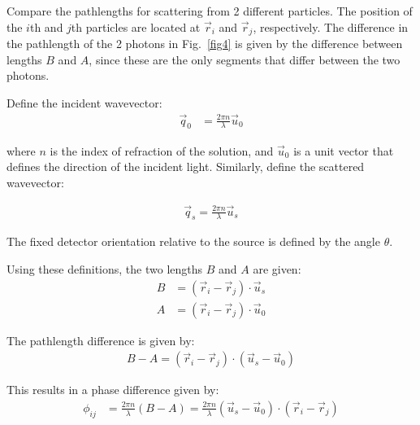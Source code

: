 \documentclass[book.tex]{subfiles}
\begin{document}

Compare the pathlengths for scattering from 2 different particles. The position of the $i$th and $j$th particles are located at $\vec{r}_i$ and $\vec{r}_j$, respectively. The difference in the pathlength of the 2 photons in Fig.~\ref{fig4} is given by the difference between lengths $B$ and $A$, since these are the only segments that differ between the two photons.

Define the incident wavevector:
\begin{align}
\vec{q}_0 &= \frac{2\pi n}{\lambda}\vec{u}_0
\end{align}

\noindent where $n$ is the index of refraction of the solution, and $\vec{u}_0$ is a unit vector that defines the direction of the incident light. Similarly, define
the scattered wavevector:

\begin{align}
\vec{q}_s = \frac{2\pi n}{\lambda}\vec{u}_s
\end{align}

The fixed detector orientation relative to the source is defined by the angle $\theta$.

Using these definitions, the two lengths $B$ and $A$ are given:
\begin{align}
B &= (\vec{r}_i - \vec{r}_j)\cdot \vec{u}_s \\
A &= (\vec{r}_i - \vec{r}_j)\cdot \vec{u}_0
\end{align}


The pathlength difference is given by:
\begin{align}
B - A = (\vec{r}_i - \vec{r}_j)\cdot (\vec{u}_s - \vec{u}_0)
\end{align}

This results in a phase difference given by:
\begin{align}
\phi_{ij} &= \frac{2\pi n}{\lambda}(B - A) = \frac{2\pi n}{\lambda}(\vec{u}_s - \vec{u}_0) \cdot (\vec{r}_i - \vec{r}_j)
\end{align}
\end{document}
